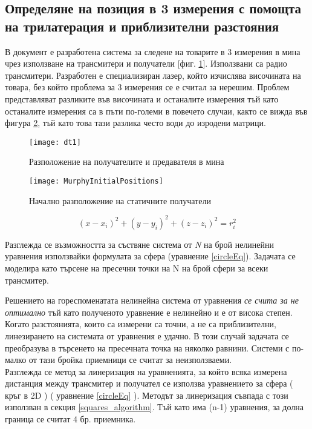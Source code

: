 \subsection{Определяне на позиция в 3 измерения с помощта на трилатерация и приблизителни разстояния}

В документ \cite{murphy} е разработена система за следене на товарите в 3 измерения в мина чрез използване на трансмитери и получатели [фиг. \ref{fig:mine}]. Използвани са радио трансмитери. Разработен е специализиран лазер, който изчислява височината на товара, без който проблема за 3 измерения се е считал за нерешим. Проблем представляват разликите във височината и останалите измерения тъй като останалите измерения са в пъти по-големи в повечето случаи, както се вижда във фигура \ref{fig:initPos}, тъй като това тази разлика често води до изродени матрици.

\begin{figure}
    \centering
    \centerline{\texttt{[image: dt1]}}
    \caption{Разположение на получателите и предавателя в мина}
    \label{fig:mine}
\end{figure}

\begin{figure}
    \centering
    \centerline{\texttt{[image: MurphyInitialPositions]}}
    \caption{Начално разположение на статичните получатели}
    \label{fig:initPos}
\end{figure}


\begin{equation}\label{circleEq}
    (x-x_i)^2 + (y-y_i)^2 +(z-z_i)^2=r_i^2
\end{equation}

Разглежда се възможността за съствяне система от \textit{N} на брой нелинейни уравнения използвайки формулата за сфера (уравнение \ref{circleEq}). Задачата се моделира като търсене на пресечни точки на N на брой сфери за всеки трансмитер.

Решението на гореспоменатата нелинейна система от уравнения \emph{се счита за не оптимално} тъй като полученото уравнение е нелинейно и е от висока степен. Когато разстоянията, които са измерени са точни, а не са приблизителни, линезирането на системата от уравнения е удачно. В този случай задачата се преобразува в търсенето на пресечната точка на няколко равнини. Системи с по-малко от тази бройка приемници се считат за неизползваеми. \\

Разглежда се метод за линеризация на уравненията, за който всяка измерена дистанция между трансмитер и получател се използва уравнението за сфера ( кръг в 2D ) ( уравнение \ref{circleEq} ). Методът за линеризация съвпада с този използван в секция \ref{squares_algorithm}. Тъй като има (n-1) уравнения, за долна граница се считат 4 бр. приемника.
\\

